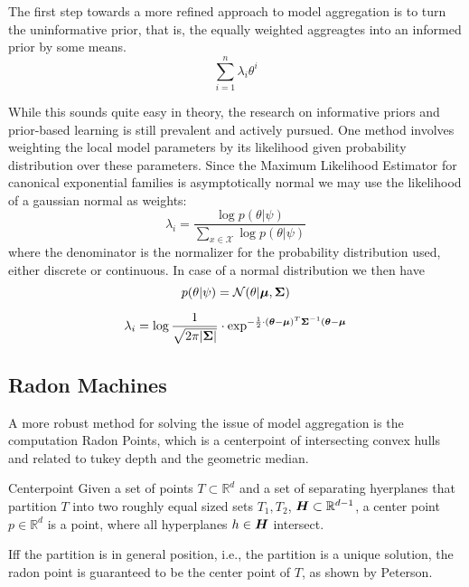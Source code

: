 The first step towards a more refined approach to model aggregation is to turn the uninformative prior, that is, the equally weighted aggreagtes into an informed prior by some means.
\begin{equation}
     \sum_{i=1}^n \lambda_i \theta^i
\end{equation}

While this sounds quite easy in theory, the research on informative priors and prior-based learning is still prevalent and actively pursued.
One method involves weighting the local model parameters by its likelihood given probability distribution over these parameters.
Since the Maximum Likelihood Estimator for canonical exponential families is asymptotically normal we may use the likelihood of a gaussian normal as weights:
\begin{equation}
    \lambda_i = \frac{\log p(\theta \lvert \psi)}{\sum_{x\in \mathcal{X}} \log p(\theta \lvert \psi)}
\end{equation}
where the denominator is the normalizer for the probability distribution used, either discrete or continuous.
In case of a normal distribution we then have
\begin{equation}
    p(\theta \lvert \psi) = \mathcal{N}(\theta \lvert \boldsymbol{\mu}, \boldsymbol{\Sigma})
\end{equation}

\begin{equation}
    \lambda_i = \log \frac{1}{\sqrt{2\pi\lvert \boldsymbol{\Sigma} \rvert}} \cdot \exp^{-\frac{1}{2} \cdot (\boldsymbol{\theta} - \boldsymbol{\mu})^T\boldsymbol{\Sigma}^{-1}(\boldsymbol{\theta} - \boldsymbol{\mu}}
\end{equation}


\subsection{Radon Machines}

A more robust method for solving the issue of model aggregation is the computation Radon Points, which is a centerpoint of intersecting convex hulls and related to tukey depth and the geometric median. 

\begin{definition}[parbox=false]{Centerpoint}
    Given a set of points $T \subset \mathbb{R}^{d}$ and a set of separating hyerplanes that partition $T$  into two roughly equal sized sets $T_1, T_2$,  $\boldsymbol{H} \subset \mathbb{R}^{d-1}$, a center point $p \in \mathbb{R}^d$ is a point, where all hyperplanes $h \in \boldsymbol{H}$ intersect.

    Iff the partition is in general position, i.e., the partition is a unique solution, the radon point is guaranteed to be the center point of $T$, as shown by Peterson.~\cite{peterson1972geometry}
\end{definition}

